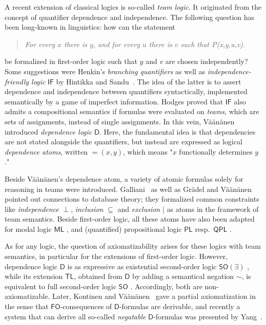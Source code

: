 \documentclass[a4paper,english,fleqn,11pt,final]{scrartcl}
\newcommand{\negg}{{\sim}}
\newcommand{\dep}[1]{{=\!\!(#1)}}
\newcommand{\logic}[1]{\ensuremath{\mathsf{#1}}\xspace}
\newcommand{\D}{\logic{D}}
\newcommand{\PL}{\logic{PL}}
\newcommand{\QPL}{\logic{QPL}}
\newcommand{\ML}{\logic{ML}}
\newcommand{\FO}{\logic{FO}}
\newcommand{\SO}{\logic{SO}}
\newcommand{\IF}{\logic{IF}}
\newcommand{\TL}{\logic{TL}}
\theoremstyle{plain}
\theoremstyle{definition}
\begin{document}
A recent extension of classical logics is so-called \emph{team logic}.
It originated from the concept of quantifier dependence and independence. The following question has been long-known in linguistics: how can the statement
\begin{quote}
\emph{For every $x$ there is $y$, and for every $u$ there is $v$ such that P(x,y,u,v).}
\end{quote} be formalized in first-order logic such that $y$ and $v$ are chosen independently?
Some suggestions were Henkin's \emph{branching quantifiers} \cite{Henkin1961} as well as \emph{in\-de\-pend\-ence-friendly logic} $\IF$ by Hintikka and Sandu~\cite{hintikka_informational_1989}.
The idea of the latter is to assert dependence and independence between quantifiers syntactically, implemented semantically by a game of imperfect information.
Hodges \cite{Hodges1997} proved that $\IF$ also admits a compositional semantics if formulas were evaluated on \emph{teams}, which are sets of assignments, instead of single assignments.
In this vein, Väänänen~\cite{vaananen_dependence_2007} introduced \emph{dependence logic} $\D$.
Here, the fundamental idea is that dependencies are not stated alongside the quantifiers, but instead are expressed as logical \emph{dependence atoms}, written $\dep{x,y}$, which means "$x$ functionally determines $y$."

\smallskip

Beside Väänänen's dependence atom, a variety of atomic formulas solely for reasoning in teams were introduced. Galliani~\cite{galliani_inclusion_2012} as well as Grädel and Väänänen~\cite{gradel2013dependence} pointed out connections to database theory; they formalized common constraints like \emph{independence} $\perp$, \emph{inclusion} $\subseteq$ and \emph{exclusion} $|$ as atoms in the framework of team semantics.
Beside first-order logic, all these atoms have also been adapted for modal logic $\ML$ \cite{vaananen_modal_2008}, and (quantified) propositional logic $\PL$ resp.\ $\QPL$ \cite{sano_et_al,yang_propositional_2016,gandalf}.

\smallskip

As for any logic, the question of axiomatizability arises for these logics with team semantics, in particular for the extensions of first-order logic.
However, dependence logic $\D$ is as expressive as existential second-order logic $\SO(\exists)$ \cite{vaananen_dependence_2007}, while its extension $\TL$, obtained from $\D$ by adding a semantical negation $\negg$, is equivalent to full second-order logic $\SO$ \cite{hutchison_team_2009}.
Accordingly, both are non-axiomatizable.
Later, Kontinen and Väänänen~\cite{kontinen_axiomatizing_2013} gave a partial axiomatization in the sense that $\FO$-consequences of $\D$-formulas are derivable, and recently a system that can derive all so-called \emph{negatable} $\D$-formulas was presented by Yang~\cite{Yang2016}.
\end{document}

